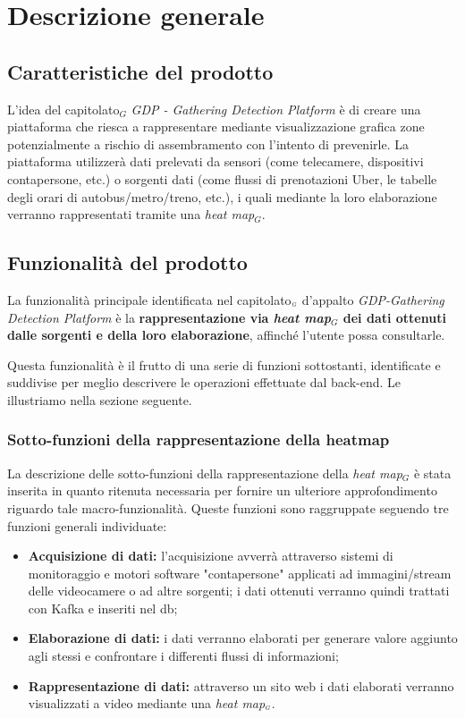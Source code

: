 \chapter{Descrizione generale}\label{descrizioneGenerale}
\section{Caratteristiche del prodotto}\label{descrizioneGeneraleCaratteristicheProdotto}
L'idea del capitolato$_G$ \textit{GDP - Gathering Detection Platform} è di creare una piattaforma che riesca a rappresentare mediante visualizzazione grafica zone potenzialmente a rischio di assembramento con l'intento di prevenirle.
La piattaforma utilizzerà dati prelevati da sensori (come telecamere, dispositivi contapersone, etc.) o sorgenti dati (come flussi di prenotazioni Uber, le tabelle degli orari di autobus/metro/treno, etc.), i quali mediante la loro elaborazione verranno rappresentati tramite una \textit{heat map$_G$}.

\section{Funzionalità del prodotto}\label{descrizioneFunzionalitàDelProdotto}
La funzionalità principale identificata nel capitolato$_{\scaleto{G}{3pt}}$ d'appalto \textit{GDP-Gathering Detection Platform} è la \textbf{rappresentazione via \textit{heat map$_G$} dei dati ottenuti dalle sorgenti e della loro elaborazione}, affinché l'utente possa consultarle.

Questa funzionalità è il frutto di una serie di funzioni sottostanti, identificate e suddivise per meglio descrivere le operazioni effettuate dal back-end.
Le illustriamo nella sezione seguente.

\subsection{Sotto-funzioni della rappresentazione della heatmap}

La descrizione delle sotto-funzioni della rappresentazione della \textit{heat map$_G$} è stata inserita in quanto ritenuta necessaria per fornire un ulteriore approfondimento riguardo tale macro-funzionalità.
Queste funzioni sono raggruppate seguendo tre funzioni generali individuate:
\begin{itemize}
	\item \textbf{Acquisizione di dati:} l'acquisizione avverrà attraverso sistemi di monitoraggio e motori software "contapersone" applicati ad immagini/stream delle videocamere o ad altre sorgenti; i dati ottenuti verranno quindi trattati con Kafka e inseriti nel db;
	\item \textbf{Elaborazione di dati:} i dati verranno elaborati per generare valore aggiunto agli stessi e confrontare i differenti flussi di informazioni;
	\item \textbf{Rappresentazione di dati:} attraverso un sito web i dati elaborati verranno visualizzati a video mediante una \textit{heat map$_{\scaleto{G}{3pt}}$}.
\end{itemize}

